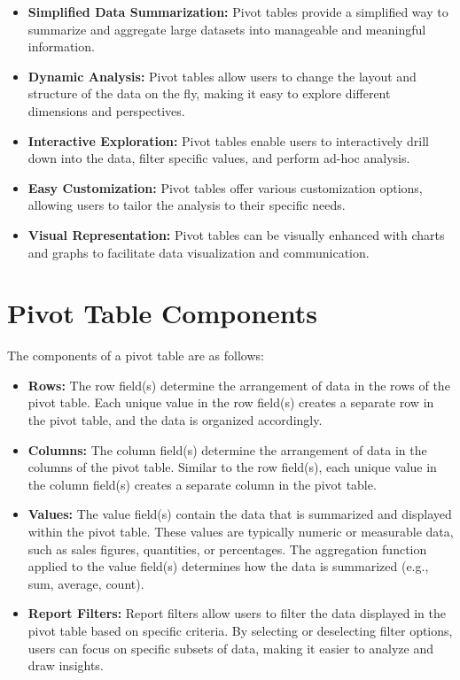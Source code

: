 \documentclass[
]{book}
\providecommand{\tightlist}{%
  \setlength{\itemsep}{0pt}\setlength{\parskip}{0pt}}
\begin{document}
\begin{itemize}
\tightlist
\item
  \textbf{Simplified Data Summarization:} Pivot tables provide a simplified way to summarize and aggregate large datasets into manageable and meaningful information.
\item
  \textbf{Dynamic Analysis:} Pivot tables allow users to change the layout and structure of the data on the fly, making it easy to explore different dimensions and perspectives.
\item
  \textbf{Interactive Exploration:} Pivot tables enable users to interactively drill down into the data, filter specific values, and perform ad-hoc analysis.
\item
  \textbf{Easy Customization:} Pivot tables offer various customization options, allowing users to tailor the analysis to their specific needs.
\item
  \textbf{Visual Representation:} Pivot tables can be visually enhanced with charts and graphs to facilitate data visualization and communication.
\end{itemize}

\hypertarget{pivot-table-components}{%
\section{Pivot Table Components}\label{pivot-table-components}}

The components of a pivot table are as follows:

\begin{itemize}
\tightlist
\item
  \textbf{Rows:} The row field(s) determine the arrangement of data in the rows of the pivot table. Each unique value in the row field(s) creates a separate row in the pivot table, and the data is organized accordingly.
\item
  \textbf{Columns:} The column field(s) determine the arrangement of data in the columns of the pivot table. Similar to the row field(s), each unique value in the column field(s) creates a separate column in the pivot table.
\item
  \textbf{Values:} The value field(s) contain the data that is summarized and displayed within the pivot table. These values are typically numeric or measurable data, such as sales figures, quantities, or percentages. The aggregation function applied to the value field(s) determines how the data is summarized (e.g., sum, average, count).
\item
  \textbf{Report Filters:} Report filters allow users to filter the data displayed in the pivot table based on specific criteria. By selecting or deselecting filter options, users can focus on specific subsets of data, making it easier to analyze and draw insights.
\end{itemize}
\end{document}
